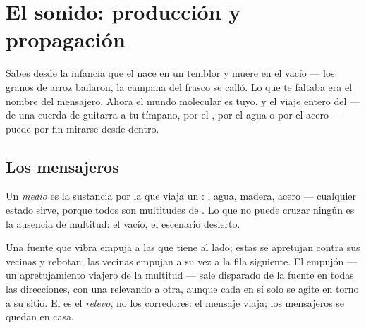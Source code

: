 \chapter{El sonido: producción y propagación}\label{ch:g7:sound-production}

Sabes desde la infancia que el  nace en un temblor y muere en el
vacío --- los granos de arroz bailaron, la campana del frasco se
calló. Lo que te faltaba era el nombre del mensajero. Ahora el mundo
molecular es tuyo, y el viaje entero del  --- de una cuerda de
guitarra a tu tímpano, por el , por el agua o por el acero ---
puede por fin mirarse desde dentro.

\section{Los mensajeros}

\begin{definition}[Medio]\label{def:g7:sound-production:medium}
Un \emph{medio} es la sustancia por la que viaja un
: , agua, madera, acero --- cualquier estado sirve,
porque todos son multitudes de . Lo que no puede cruzar
ningún  es la ausencia de multitud: el vacío, el escenario
desierto.
\end{definition}

\begin{proposition}\label{prop:g7:sound-production:travel}
Una fuente que vibra empuja a las  que tiene al lado; estas
se apretujan contra sus vecinas y rebotan; las vecinas empujan a su
vez a la fila siguiente. El empujón --- un apretujamiento viajero de
la multitud --- sale disparado de la fuente en todas las direcciones,
con una  relevando a otra, aunque cada  en sí
solo se agite en torno a su sitio. El  es el \emph{relevo}, no
los corredores: el mensaje viaja; los mensajeros se quedan en casa.
\end{proposition}


